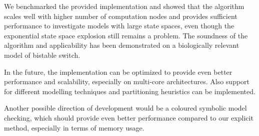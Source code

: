 \documentclass[12pt,oneside]{fithesis2}
\begin{document}
		We benchmarked the provided implementation and showed that the algorithm scales well with higher number of computation nodes and provides sufficient performance to investigate models with large state spaces, even though the exponential state space explosion still remains a problem. The soundness of the algorithm and applicability has been demonstrated on a biologically relevant model of bistable switch.
		
		In the future, the implementation can be optimized to provide even better performance and scalability, especially on multi-core architectures. Also support for different modelling techniques and partitioning heuristics can be implemented.
		
		Another possible direction of development would be a coloured symbolic model checking, which should provide even better performance compared to our explicit method, especially in terms of memory usage. 
		
		
		
			
					
      
	
	
\end{document}
